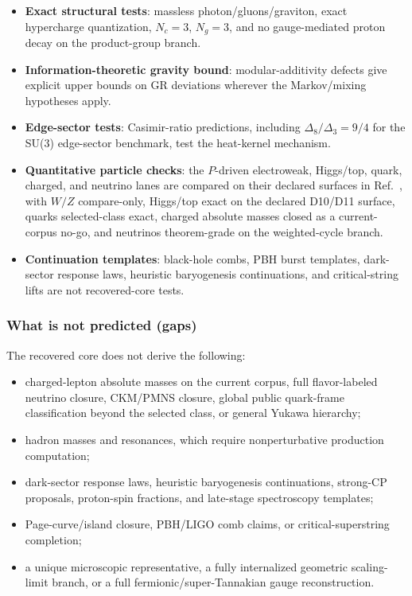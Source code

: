 \begin{itemize}
\tightlist
\item \textbf{Exact structural tests}: massless photon/gluons/graviton, exact hypercharge
quantization, \(N_c=3\), \(N_g=3\), and no gauge-mediated proton decay on the product-group branch.
\item \textbf{Information-theoretic gravity bound}: modular-additivity defects give explicit
upper bounds on GR deviations wherever the Markov/mixing hypotheses apply.
\item \textbf{Edge-sector tests}: Casimir-ratio predictions, including
\(\Delta_8/\Delta_3=9/4\) for the SU(3) edge-sector benchmark, test the heat-kernel mechanism.
\item \textbf{Quantitative particle checks}: the \(P\)-driven electroweak, Higgs/top, quark, charged, and
neutrino lanes are compared on their declared surfaces in Ref.~\cite{ophparticles}, with \(W/Z\) compare-only, Higgs/top exact on the declared D10/D11 surface, quarks selected-class exact, charged absolute masses closed as a current-corpus no-go, and neutrinos theorem-grade on the weighted-cycle branch.
\item \textbf{Continuation templates}: black-hole combs, PBH burst templates, dark-sector
response laws, heuristic baryogenesis continuations, and critical-string lifts are not recovered-core tests.
\end{itemize}

\subsubsection{What is not predicted (gaps)}\label{84-what-is-not-predicted-gaps}

The recovered core does not derive the following:
\begin{itemize}
\item charged-lepton absolute masses on the current corpus, full flavor-labeled neutrino closure, CKM/PMNS closure, global public quark-frame classification beyond the selected class, or general Yukawa hierarchy;
\item hadron masses and resonances, which require nonperturbative production computation;
\item dark-sector response laws, heuristic baryogenesis continuations, strong-CP proposals, proton-spin fractions, and
late-stage spectroscopy templates;
\item Page-curve/island closure, PBH/LIGO comb claims, or critical-superstring completion;
\item a unique microscopic representative, a fully internalized geometric scaling-limit branch,
or a full fermionic/super-Tannakian gauge reconstruction.
\end{itemize}

